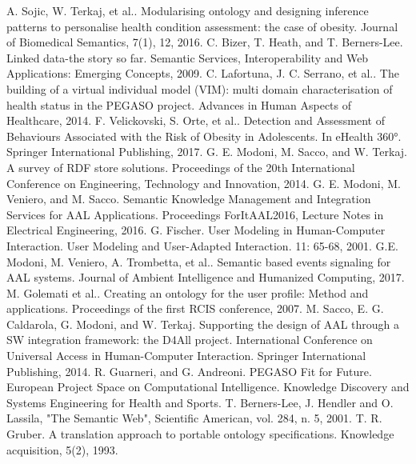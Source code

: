 \documentclass[runningheads,a4paper]{llncs}
\begin{document}
\begin{thebibliography}{4}

 A. Sojic, W. Terkaj, et al.. Modularising ontology and designing inference patterns to personalise health condition assessment: the case of obesity. Journal of Biomedical Semantics, 7(1), 12, 2016.
 C. Bizer, T. Heath, and T. Berners-Lee. Linked data-the story so far. Semantic Services, Interoperability and Web Applications: Emerging Concepts, 2009.
 C. Lafortuna, J. C. Serrano, et al.. The building of a virtual individual model (VIM): multi domain characterisation of health status in the PEGASO project. Advances in Human Aspects of Healthcare, 2014.
 F. Velickovski, S. Orte, et al.. Detection and Assessment of Behaviours Associated with the Risk of Obesity in Adolescents. In eHealth 360°. Springer International Publishing, 2017.
 G. E. Modoni, M. Sacco, and W. Terkaj. A survey of RDF store solutions. Proceedings of the 20th International Conference on Engineering, Technology and Innovation, 2014.
 G. E. Modoni, M. Veniero, and M. Sacco. Semantic Knowledge Management and Integration Services for AAL Applications. Proceedings ForItAAL2016, Lecture Notes in Electrical Engineering, 2016.
 G. Fischer. User Modeling in Human-Computer Interaction. User Modeling and User-Adapted Interaction. 11: 65-68, 2001.
 G.E. Modoni, M. Veniero, A. Trombetta, et al.. Semantic based events signaling for AAL systems. Journal of Ambient Intelligence and Humanized Computing, 2017.
 M. Golemati et al.. Creating an ontology for the user profile: Method and applications. Proceedings of the first RCIS conference, 2007.
 M. Sacco, E. G. Caldarola, G. Modoni, and W. Terkaj. Supporting the design of AAL through a SW integration framework: the D4All project. International Conference on Universal Access in Human-Computer Interaction. Springer International Publishing, 2014.
 R. Guarneri, and G. Andreoni. PEGASO Fit for Future. European Project Space on Computational Intelligence. Knowledge Discovery and Systems Engineering for Health and Sports.
 T. Berners-Lee, J. Hendler and O. Lassila, "The Semantic Web", Scientific American, vol. 284, n. 5, 2001.
 T. R. Gruber. A translation approach to portable ontology specifications. Knowledge acquisition, 5(2), 1993.

\end{thebibliography}
\end{document}
